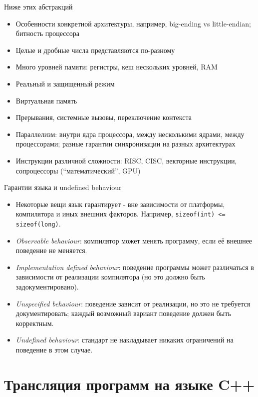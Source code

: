 \documentclass[unknownkeysallowed,xcolor=table]{beamer}
\begin{document}
\begin{frame}{Ниже этих абстракций}
  \begin{itemize}
    \item Особенности конкретной архитектуры, например, big-ending vs little-endian; битность процессора
    \item Целые и дробные числа представляются по-разному
    \item Много уровней памяти: регистры, кеш нескольких уровней, RAM
    \item Реальный и защищенный режим
    \item Виртуальная память
    \item Прерывания, системные вызовы, переключение контекста
    \item Параллелизм: внутри ядра процессора, между несколькими ядрами, между процессорами; разные гарантии синхронизации на разных архитектурах
    \item Инструкции различной сложности: RISC, CISC, векторные инструкции, сопроцессоры (“математический”, GPU)
  \end{itemize}
\end{frame}

\begin{frame}{Гарантии языка и undefined behaviour}
  \begin{itemize}
    \item Некоторые вещи язык гарантирует - вне зависимости от платформы, компилятора и иных внешних факторов. Например, \lstinline{sizeof(int) <= sizeof(long)}.
    \item \emph{Observable behaviour}: компилятор может менять программу, если её внешнее поведение не меняется.
    \item \emph{Implementation defined behaviour}: поведение программы может различаться в зависимости от реализации компилятора (но это должно быть задокументировано).
    \item \emph{Unspecified behaviour}: поведение зависит от реализации, но это не требуется документировать; каждый возможный вариант поведение должен быть корректным.
    \item \emph{Undefined behaviour}: стандарт не накладывает никаких ограничений на поведение в этом случае.
  \end{itemize}
\end{frame}

\section{Трансляция программ на языке C++}
\end{document}
